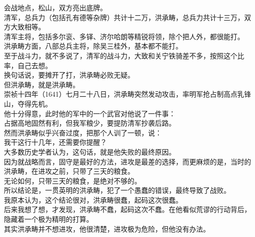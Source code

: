 \begin{multicols}{\theparacolNo}
会战地点，松山，双方亮出底牌。\\

清军，总兵力（包括孔有德等杂牌）共计十二万，洪承畴，总兵力共计十三万，双方大致相等。\\

清军主将，包括多尔衮、多铎、济尔哈朗等精锐将领，除个把人外，都很能打。\\

洪承畴方面，八部总兵主将，除吴三桂外，基本都不能打。\\

至于战斗力，就不多说了，清军的战斗力，大致和关宁铁骑差不多，按照这个比率，自己去想。\\

换句话说，要摊开了打，洪承畴必败无疑。\\

但洪承畴，就是洪承畴。\\

崇祯十四年（1641）七月二十八日，洪承畴突然发动攻击，率明军抢占制高点乳锋山，夺得先机。\\

他十分得意，此时他的军中的一个武官对他说了一件事：\\

占据高地固然有利，但我军粮少，要提防清军抄袭后路。\\

然而洪承畴似乎兴奋过度，把那个人训了一顿，说：\\

我干这行十几年，还需要你提醒？\\

大多数历史学者认为，这句话，就是他失败的最终原因。\\

因为就战略而言，固守是最好的方法，进攻是最差的选择，而更麻烦的是，当时的洪承畴，在进攻之前，只带了三天的粮食。\\

无论如何，只带三天的粮食，是绝对不够的。\\

所以结论是，一贯英明的洪承畴，犯了一个愚蠢的错误，最终导致了战败。\\

我原本认为，这个结论很对，洪承畴很蠢，起码这次很蠢。\\

后来我想了想，才发现，洪承畴不蠢，起码这次不蠢。在他看似荒谬的行动背后，隐藏着一个极为精明的打算。\\

其实洪承畴并不想进攻，他很清楚，进攻极为危险，但他没有办法。\\


\end{multicols}
